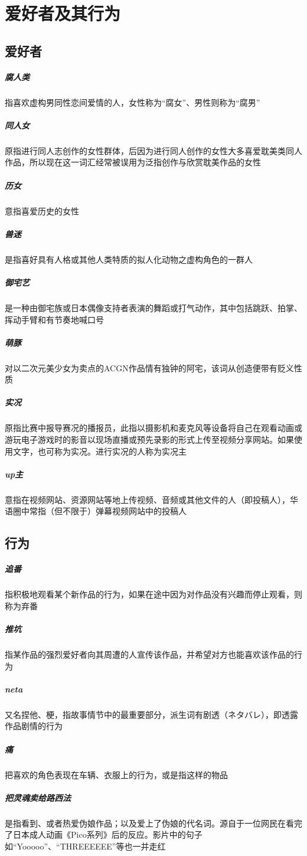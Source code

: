 \documentclass[UTF8,12pt]{ctexart}
\begin{document}
\section{爱好者及其行为}
\subsection{爱好者}
\subparagraph{腐人类}指喜欢虚构男同性恋间爱情的人，女性称为“腐女”、男性则称为“腐男”
\subparagraph{同人女}原指进行同人志创作的女性群体，后因为进行同人创作的女性大多喜爱耽美类同人作品，所以现在这一词汇经常被误用为泛指创作与欣赏耽美作品的女性
\subparagraph{历女}意指喜爱历史的女性
\subparagraph{兽迷}是指喜好具有人格或其他人类特质的拟人化动物之虚构角色的一群人
\subparagraph{御宅艺}是一种由御宅族或日本偶像支持者表演的舞蹈或打气动作，其中包括跳跃、拍掌、挥动手臂和有节奏地喊口号
\subparagraph{萌豚}对以二次元美少女为卖点的ACGN作品情有独钟的阿宅，该词从创造便带有贬义性质
\subparagraph{实况}原指比赛中报导赛况的播报员，此指以摄影机和麦克风等设备将自己在观看动画或游玩电子游戏时的影音以现场直播或预先录影的形式上传至视频分享网站。如果使用文字，也可称为实况。进行实况的人称为实况主
\subparagraph{up主}意指在视频网站、资源网站等地上传视频、音频或其他文件的人（即投稿人），华语圈中常指（但不限于）弹幕视频网站中的投稿人

\subsection{行为}
\subparagraph{追番}指积极地观看某个新作品的行为，如果在途中因为对作品没有兴趣而停止观看，则称为弃番
\subparagraph{推坑}指某作品的强烈爱好者向其周遭的人宣传该作品，并希望对方也能喜欢该作品的行为
\subparagraph{neta}又名捏他、梗，指故事情节中的最重要部分，派生词有剧透（ネタバレ），即透露作品剧情的行为
\subparagraph{痛}把喜欢的角色表现在车辆、衣服上的行为，或是指这样的物品
\subparagraph{把灵魂卖给路西法}是指看到、或者热爱伪娘作品；以及爱上了伪娘的代名词。源自于一位网民在看完了日本成人动画《Pico系列》后的反应。影片中的句子如“Yooooo”、“THREEEEEE”等也一并走红
\end{document}
